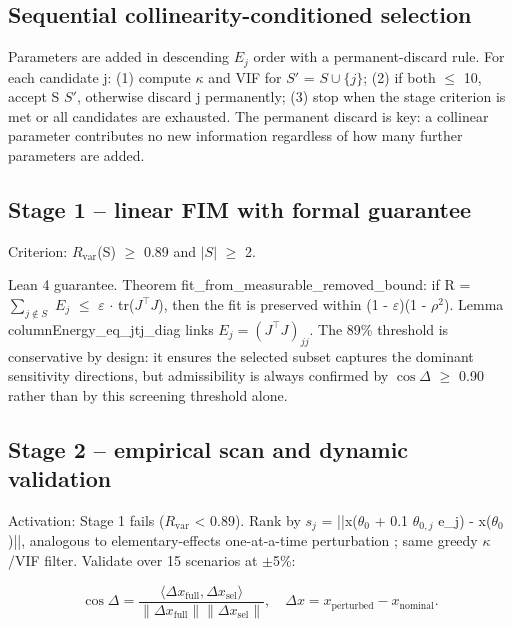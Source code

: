 \documentclass[pdflatex,sn-nature]{sn-jnl}
\begin{document}
\subsection{Sequential collinearity-conditioned selection}\label{sec:greedy}


Parameters are added in descending $E_j$ order with a permanent-discard rule. For each candidate j: (1) compute $\kappa$ and VIF for $S'$ = $S\cup\{j\}$; (2) if both $\le$ 10, accept S \leftarrow  $S'$, otherwise discard j permanently; (3) stop when the stage criterion is met or all candidates are exhausted. The permanent discard is key: a collinear parameter contributes no new information regardless of how many further parameters are added.


\subsection{Stage 1 -- linear FIM with formal guarantee}\label{sec:stage1}


Criterion: $R_{\mathrm{var}}$(S) $\ge$ 0.89 and $|S|$ $\ge$ 2.


Lean 4 guarantee. Theorem fit\_from\_measurable\_removed\_bound: if R = $\sum_{j\notin S}$ $E_j$ $\le$ $\varepsilon$ $\cdot$ tr($J^\top J$), then the fit is preserved within (1 - $\varepsilon$)(1 - $\rho^2$). Lemma columnEnergy\_eq\_jtj\_diag links $E_j=(J^\top J)_{jj}$. The 89\% threshold is conservative by design: it ensures the selected subset captures the dominant sensitivity directions, but admissibility is always confirmed by $\cos\Delta$ $\ge$ 0.90 rather than by this screening threshold alone.


\subsection{Stage 2 -- empirical scan and dynamic validation}\label{sec:stage2}


Activation: Stage 1 fails ($R_{\mathrm{var}}$ < 0.89). Rank by $s_j$ = ||x($\theta_0$ + 0.1 $\theta_{0,j}$ e\_j) - x($\theta_0$)||, analogous to elementary-effects one-at-a-time perturbation \cite{bib23}; same greedy $\kappa$/VIF filter. Validate over 15 scenarios at $\pm$5\%:


\begin{equation}
\cos\Delta=\frac{\langle\Delta x_{\mathrm{full}},\Delta x_{\mathrm{sel}}\rangle}{\|\Delta x_{\mathrm{full}}\|\|\Delta x_{\mathrm{sel}}\|},\quad \Delta x=x_{\mathrm{perturbed}}-x_{\mathrm{nominal}}.
\label{eq:cos}
\end{equation}
\end{document}
